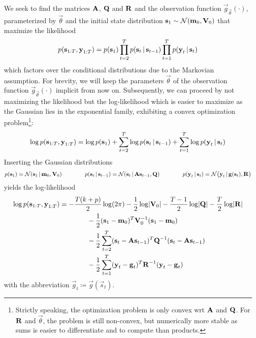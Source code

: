 	We seek to find the matrices \(\boldsymbol{\mathrm{A}}\), \(\boldsymbol{\mathrm{Q}}\) and \(\boldsymbol{\mathrm{R}}\) and the observation function \( \vec{g}_{\vec{\theta}}(\cdot) \), parameterized by \(\vec{\theta}\) and the initial state distribution \( \boldsymbol{\mathrm{s}}_1 \sim \mathcal{N}(\boldsymbol{\mathrm{m}}_0, \boldsymbol{\mathrm{V}}_0) \) that maximize the likelihood
	\begin{equation*}
		p(\boldsymbol{\mathrm{s}}_{1:T}, \boldsymbol{\mathrm{y}}_{1:T}) = p(\boldsymbol{\mathrm{s}}_1) \prod_{t = 2}^{T} p(\boldsymbol{\mathrm{s}}_t \,\vert\, \boldsymbol{\mathrm{s}}_{t - 1}) \prod_{t = 1}^{T} p(\boldsymbol{\mathrm{y}}_t \,\vert\, \boldsymbol{\mathrm{s}}_t)
	\end{equation*}
	which factors over the conditional distributions due to the Markovian assumption. For brevity, we will keep the parameters \( \vec{\theta} \) of the observation function \( \vec{g}_{\vec{\theta}}(\cdot) \) implicit from now on. Subsequently, we can proceed by not maximizing the likelihood but the log-likelihood which is easier to maximize as the Gaussian lies in the exponential family, exhibiting a convex optimization problem\footnote{Strictly speaking, the optimization problem is only convex \ac{wrt} \(\boldsymbol{\mathrm{A}}\) and \(\boldsymbol{\mathrm{Q}}\). For \(\boldsymbol{\mathrm{R}}\) and \(\vec{\theta}\), the problem is still non-convex, but numerically more stable as sums is easier to differentiate and to compute than products.}:
	\begin{equation*}
		\log p(\boldsymbol{\mathrm{s}}_{1:T}, \boldsymbol{\mathrm{y}}_{1:T}) = \log p(\boldsymbol{\mathrm{s}}_1) + \sum_{t = 2}^{T} \log p(\boldsymbol{\mathrm{s}}_t \,\vert\, \boldsymbol{\mathrm{s}}_{t - 1}) + \sum_{t = 1}^{T} \log p(\boldsymbol{\mathrm{y}}_t \,\vert\, \boldsymbol{\mathrm{s}}_t)
	\end{equation*}
	Inserting the Gaussian distributions
	\begin{equation*}
		p(\boldsymbol{\mathrm{s}}_1) = \mathcal{N}(\boldsymbol{\mathrm{s}}_1 \,\vert\, \boldsymbol{\mathrm{m}}_0, \boldsymbol{\mathrm{V}}_0) \qquad\qquad
		p(\boldsymbol{\mathrm{s}}_t \,\vert\, \boldsymbol{\mathrm{s}}_{t - 1}) = \mathcal{N}(\boldsymbol{\mathrm{s}}_t \,\vert\, \boldsymbol{\mathrm{A}} \boldsymbol{\mathrm{s}}_{t - 1}, \boldsymbol{\mathrm{Q}}) \qquad\qquad
		p(\boldsymbol{\mathrm{y}}_t \,\vert\, \boldsymbol{\mathrm{s}}_t) = \mathcal{N}\big(\boldsymbol{\mathrm{y}}_t \,\vert\, \boldsymbol{\mathrm{g}}(\boldsymbol{\mathrm{s}}_t), \boldsymbol{\mathrm{R}}\big)
	\end{equation*}
	yields the log-likelihood
	\begin{align*}
		\log p(\boldsymbol{\mathrm{s}}_{1:T}, \boldsymbol{\mathrm{y}}_{1:T})
			&= -\frac{T(k + p)}{2} \log(2\pi) - \frac{1}{2} \log \lvert \boldsymbol{\mathrm{V}}_0 \rvert - \frac{T - 1}{2} \log \lvert \boldsymbol{\mathrm{Q}} \rvert - \frac{T}{2} \log \lvert \boldsymbol{\mathrm{R}} \rvert \\
			&\qquad\qquad -\frac{1}{2} (\boldsymbol{\mathrm{s}}_1 - \boldsymbol{\mathrm{m}}_0)^T \boldsymbol{\mathrm{V}}_0^{-1} (\boldsymbol{\mathrm{s}}_1 - \boldsymbol{\mathrm{m}}_0) \\
			&\qquad\qquad -\frac{1}{2} \sum_{t = 2}^{T} (\boldsymbol{\mathrm{s}}_t - \boldsymbol{\mathrm{A}} \boldsymbol{\mathrm{s}}_{t - 1})^T \boldsymbol{\mathrm{Q}}^{-1} (\boldsymbol{\mathrm{s}}_t - \boldsymbol{\mathrm{A}} \boldsymbol{\mathrm{s}}_{t - 1}) \\
			&\qquad\qquad -\frac{1}{2} \sum_{t = 1}^{T} (\boldsymbol{\mathrm{y}}_t - \boldsymbol{\mathrm{g}}_t)^T \boldsymbol{\mathrm{R}}^{-1} (\boldsymbol{\mathrm{y}}_t - \boldsymbol{\mathrm{g}}_t)
	\end{align*}
	with the abbreviation \( \vec{g}_t \coloneqq \vec{g}(\vec{s}_t) \).


